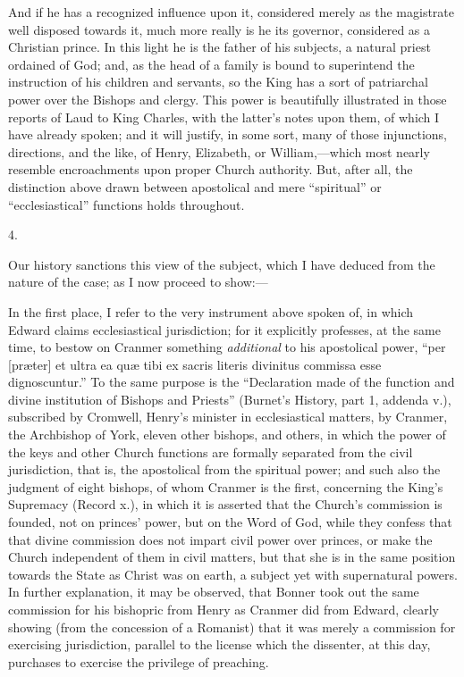 And if he has a recognized
influence upon it, considered merely as the magistrate well disposed
towards it, much more really is he its governor, considered as a
Christian prince. In this light he is the father of his subjects, a
natural priest ordained of God; and, as the head of a family is bound
to superintend the instruction of his children and servants, so the
King has a sort of patriarchal power over the Bishops and clergy. This
power is beautifully illustrated in those reports of Laud to King
Charles, with the latter's notes upon them, of which I have already
spoken; and it will justify, in some sort, many of those injunctions,
directions, and the like, of Henry, Elizabeth, or William,—which
most nearly resemble encroachments upon proper Church authority. But,
after all, the distinction above drawn between apostolical and mere ``spiritual''
or ``ecclesiastical'' functions holds throughout.

4.

Our history sanctions this
view of the subject, which I have deduced from the nature of the case;
as I now proceed to show:—

In the first place, I refer to
the very instrument above spoken of, in which Edward claims
ecclesiastical jurisdiction; for it explicitly professes, at the same
time, to bestow on Cranmer something \emph{additional} to his
apostolical power, ``per [præter] et ultra ea quæ tibi ex sacris
literis divinitus commissa esse dignoscuntur.'' To the same purpose is
the ``Declaration made of the function and divine institution of
Bishops and Priests'' (Burnet's History, part 1, addenda v.),
subscribed by Cromwell, Henry's minister in ecclesiastical matters, by
Cranmer, the Archbishop of York, eleven other bishops, and others, in
which the power of the keys and other Church functions are formally
separated from the civil jurisdiction, that is, the apostolical from
the spiritual power; and such also the judgment of eight bishops, of
whom Cranmer is the first, concerning the King's Supremacy (Record
x.), in which it is asserted that the Church's commission is founded,
not on princes' power, but on the Word of God, while they confess that
that divine commission does not impart civil power over princes, or
make the Church independent of them in civil matters, but that she is
in the same position towards the State as Christ was on earth, a
subject yet with supernatural powers. In further explanation, it may
be observed, that Bonner took out the same commission for his
bishopric from Henry as Cranmer did from Edward, clearly showing (from
the concession of a Romanist) that it was merely a commission for
exercising jurisdiction, parallel to the license which the dissenter,
at this day, purchases to exercise the privilege of preaching.

